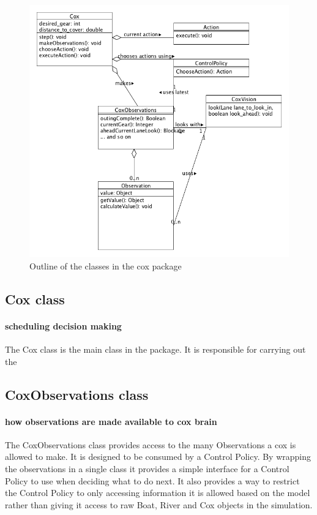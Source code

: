 \begin{figure}
\begin{center}
  \includegraphics[scale=0.3]{images/coxpackageUML.png}
  \caption{Outline of the classes in the cox package}
  \label{software:fig:coxUML}
\end{center}
\end{figure}

\subsection{Cox class}
\paragraph{scheduling decision making}
The Cox class is the main class in the package. It is responsible for carrying out the 

\subsection{CoxObservations class}
\paragraph{how observations are made available to cox brain}
The CoxObservations class provides access to the many Observations a cox is allowed to make. It is designed to be consumed by a Control Policy. By wrapping the observations in a single class it provides a simple interface for a Control Policy to use when deciding what to do next. It also provides a way to restrict the Control Policy to only accessing information it is allowed based on the model rather than giving it access to raw Boat, River and Cox objects in the simulation.

